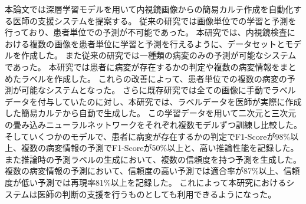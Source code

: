 本論文では深層学習モデルを用いて内視鏡画像からの簡易カルテ作成を自動化する医師の支援システムを提案する。
従来の研究では画像単位での学習と予測を行っており、患者単位での予測が不可能であった。
本研究では、内視鏡検査における複数の画像を患者単位に学習と予測を行えるように、データセットとモデルを作成した。
また従来の研究では一種類の病変のみの予測が可能なシステムであった。
本研究では患者に病変が存在するかの判定や複数の病変情報をまとめたラベルを作成した。
これらの改善によって、患者単位での複数の病変の予測が可能なシステムとなった。
さらに既存研究では全ての画像に手動でラベルデータを付与していたのに対し、本研究では、ラベルデータを医師が実際に作成した簡易カルテから自動で生成した。
この学習データを用いて二次元と三次元の畳み込みニューラルネットワークをそれぞれ複数モデルずつ訓練し比較した。そしていくつかのモデルで、患者に病変が存在するかの判定でF1-Scoreが98\%以上、複数の病変情報の予測でF1-Scoreが50\%以上と、高い推論性能を記録した。
また推論時の予測ラベルの生成において、複数の信頼度を持つ予測を生成した。
複数の病変情報の予測において、信頼度の高い予測では適合率が87\%以上、信頼度が低い予測では再現率81\%以上を記録した。
これによって本研究におけるシステムは医師の判断の支援を行うものとしても利用できるようになった。
